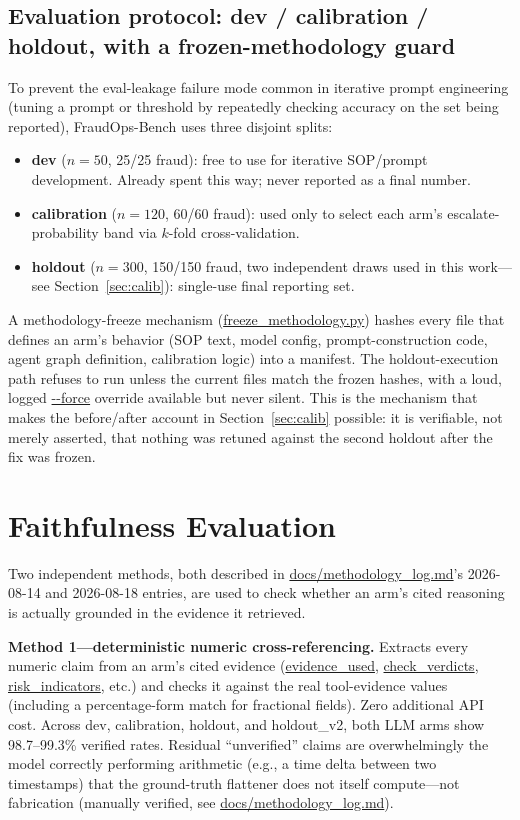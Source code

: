 \documentclass[]{ieeeaccess}
\newcommand{\code}[1]{\url{#1}}
\begin{document}
\subsection{Evaluation protocol: dev / calibration / holdout, with a frozen-methodology guard}\label{sec:protocol}

To prevent the eval-leakage failure mode common in iterative prompt
engineering (tuning a prompt or threshold by repeatedly checking accuracy
on the set being reported), FraudOps-Bench uses three disjoint splits:

\begin{itemize}
\item \textbf{dev} ($n=50$, 25/25 fraud): free to use for iterative
  SOP/prompt development. Already spent this way; never reported as a
  final number.
\item \textbf{calibration} ($n=120$, 60/60 fraud): used only to select
  each arm's escalate-probability band via $k$-fold cross-validation.
\item \textbf{holdout} ($n=300$, 150/150 fraud, two independent draws
  used in this work---see Section~\ref{sec:calib}): single-use final reporting set.
\end{itemize}

A methodology-freeze mechanism (\code{freeze_methodology.py}) hashes
every file that defines an arm's behavior (SOP text, model config,
prompt-construction code, agent graph definition, calibration logic)
into a manifest. The holdout-execution path refuses to run unless the
current files match the frozen hashes, with a loud, logged
\code{--force} override available but never silent. This is the
mechanism that makes the before/after account in Section~\ref{sec:calib} possible: it
is verifiable, not merely asserted, that nothing was retuned against the
second holdout after the fix was frozen.

\section{Faithfulness Evaluation}\label{sec:faith}

Two independent methods, both described in \code{docs/methodology_log.md}'s
2026-08-14 and 2026-08-18 entries, are used to check whether an arm's
cited reasoning is actually grounded in the evidence it retrieved.

\textbf{Method 1---deterministic numeric cross-referencing.} Extracts
every numeric claim from an arm's cited evidence (\code{evidence_used},
\code{check_verdicts}, \code{risk_indicators}, etc.) and checks it
against the real tool-evidence values (including a percentage-form match
for fractional fields). Zero additional API cost. Across dev,
calibration, holdout, and holdout\_v2, both LLM arms show 98.7--99.3\%
verified rates. Residual ``unverified'' claims are overwhelmingly the
model correctly performing arithmetic (e.g., a time delta between two
timestamps) that the ground-truth flattener does not itself compute---not fabrication (manually verified, see \code{docs/methodology_log.md}).
\end{document}
